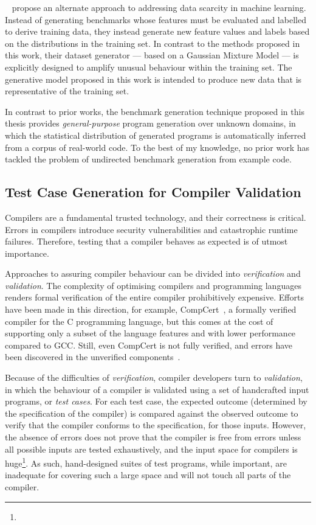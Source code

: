 \citeauthor{Ding2019}~\cite{Ding2019} propose an alternate approach to addressing data scarcity in machine learning. Instead of generating benchmarks whose features must be evaluated and labelled to derive training data, they instead generate new feature values and labels based on the distributions in the training set. In contrast to the methods proposed in this work, their dataset generator --- based on a Gaussian Mixture Model --- is explicitly designed to amplify unusual behaviour within the training set. The generative model proposed in this work is intended to produce new data that is representative of the training set.

In contrast to prior works, the benchmark generation technique proposed in this thesis provides \emph{general-purpose} program generation over unknown domains, in which the statistical distribution of generated programs is automatically inferred from a corpus of real-world code. To the best of my knowledge, no prior work has tackled the problem of undirected benchmark generation from example code.


\subsection{Test Case Generation for Compiler Validation}

Compilers are a fundamental trusted technology, and their correctness is critical. Errors in compilers introduce security vulnerabilities and catastrophic runtime failures. Therefore, testing that a compiler behaves as expected is of utmost importance.

Approaches to assuring compiler behaviour can be divided into \emph{verification} and \emph{validation}. The complexity of optimising compilers and programming languages renders formal verification of the entire compiler prohibitively expensive. Efforts have been made in this direction, for example, CompCert~\cite{Leroy2013}, a formally verified compiler for the C programming language, but this comes at the cost of supporting only a subset of the language features and with lower performance compared to GCC. Still, even CompCert is not fully verified, and errors have been discovered in the unverified components~\cite{Yang2011}.

Because of the difficulties of \emph{verification}, compiler developers turn to \emph{validation}, in which the behaviour of a compiler is validated using a set of handcrafted input programs, or \emph{test cases}. For each test case, the expected outcome (determined by the specification of the compiler) is compared against the observed outcome to verify that the compiler conforms to the specification, for those inputs. However, the absence of errors does not prove that the compiler is free from errors unless all possible inputs are tested exhaustively, and the input space for compilers is huge\footnote{}. As such, hand-designed suites of test programs, while important, are inadequate for covering such a large space and will not touch all parts of the compiler.

